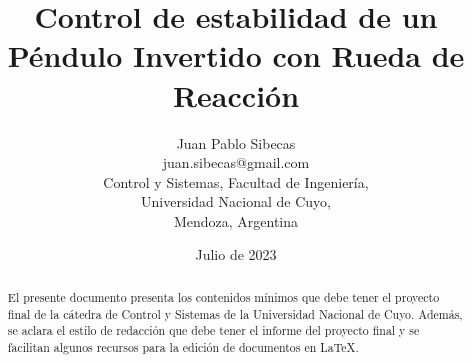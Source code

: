 \documentclass{article}
\title{Control de estabilidad de un Péndulo Invertido con Rueda de Reacción}
\author{Juan Pablo Sibecas \\ juan.sibecas@gmail.com \\ Control y Sistemas, Facultad de Ingeniería, \\ Universidad Nacional de Cuyo, \\ Mendoza, Argentina}
\date{Julio de 2023}
\begin{document}
\renewcommand{\tablename}{Tabla}

\maketitle

\begin{abstract}
    El presente documento presenta los contenidos mínimos que debe tener el proyecto final de la cátedra de Control 
    y Sistemas de la Universidad Nacional de Cuyo. Además, se aclara el estilo de redacción que debe tener el informe 
    del proyecto final y se facilitan algunos recursos para la edición de documentos en \LaTeX.  
\end{abstract}
\end{document}
